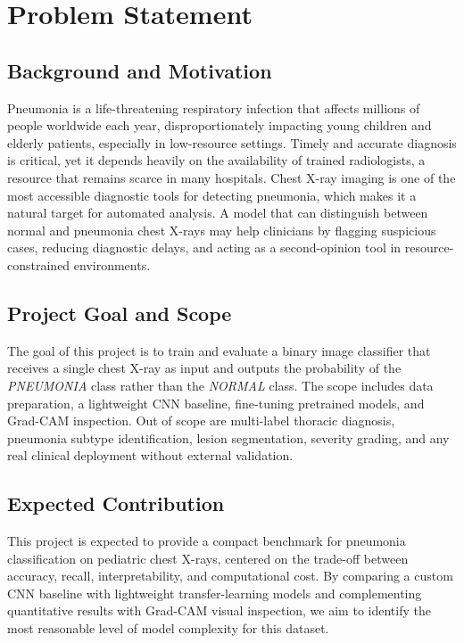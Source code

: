 \documentclass[acmsmall,screen,nonacm]{acmart}
\begin{document}
\maketitle

\section{Problem Statement}

\subsection{Background and Motivation}
Pneumonia is a life-threatening respiratory infection that affects millions of people worldwide each year, disproportionately impacting young children and elderly patients, especially in low-resource settings. Timely and accurate diagnosis is critical, yet it depends heavily on the availability of trained radiologists, a resource that remains scarce in many hospitals. Chest X-ray imaging is one of the most accessible diagnostic tools for detecting pneumonia, which makes it a natural target for automated analysis. A model that can distinguish between normal and pneumonia chest X-rays may help clinicians by flagging suspicious cases, reducing diagnostic delays, and acting as a second-opinion tool in resource-constrained environments.

\subsection{Project Goal and Scope}
The goal of this project is to train and evaluate a binary image classifier that receives a single chest X-ray as input and outputs the probability of the \textit{PNEUMONIA} class rather than the \textit{NORMAL} class. The scope includes data preparation, a lightweight CNN baseline, fine-tuning pretrained models, and Grad-CAM inspection. Out of scope are multi-label thoracic diagnosis, pneumonia subtype identification, lesion segmentation, severity grading, and any real clinical deployment without external validation.

\subsection{Expected Contribution}
This project is expected to provide a compact benchmark for pneumonia classification on pediatric chest X-rays, centered on the trade-off between accuracy, recall, interpretability, and computational cost. By comparing a custom CNN baseline with lightweight transfer-learning models and complementing quantitative results with Grad-CAM visual inspection, we aim to identify the most reasonable level of model complexity for this dataset.
\end{document}
